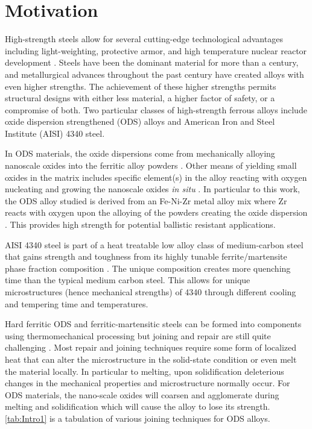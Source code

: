 
\section*{Motivation}
	High-strength steels allow for several cutting-edge technological advantages including light-weighting, protective armor, and high temperature nuclear reactor development \cite{RN707}. Steels have been the dominant material for more than a century, and metallurgical advances throughout the past century have created alloys with even higher strengths. The achievement of these higher strengths permits structural designs with either less material, a higher factor of safety, or a compromise of both. Two particular classes of high-strength ferrous alloys include oxide dispersion strengthened (ODS) alloys and American Iron and Steel Institute (AISI) 4340 steel. 
	
	In ODS materials, the oxide dispersions come from mechanically alloying nanoscale oxides into the ferritic alloy powders \cite{RN1177}. Other means of yielding small oxides in the matrix includes specific element(s) in the alloy reacting with oxygen nucleating and growing the nanoscale oxides \textit{in situ} \cite{RN114}. In particular to this work, the ODS alloy studied is derived from an Fe-Ni-Zr metal alloy mix where Zr reacts with oxygen upon the alloying of the powders creating the oxide dispersion \cite{RN740}. This provides high strength for potential ballistic resistant applications. 
	
	AISI 4340 steel is part of a heat treatable low alloy class of medium-carbon steel that gains strength and toughness from its highly tunable ferrite/martensite phase fraction composition \cite{RN1435, RN1429, RN1447, RN1438}. The unique composition creates more quenching time than the typical medium carbon steel. This allows for unique microstructures (hence mechanical strengths) of 4340 through different cooling and tempering time and temperatures.
	
	Hard ferritic ODS and ferritic-martensitic steels can be formed into components using thermomechanical processing but joining and repair are still quite challenging \cite{RN3361}. Most repair and joining techniques require some form of localized heat that can alter the microstructure in the solid-state condition or even melt the material locally. In particular to melting, upon solidification deleterious changes in the mechanical properties and microstructure normally occur. For ODS materials, the nano-scale oxides will coarsen and agglomerate during melting and solidification which will cause the alloy to lose its strength. \ref{tab:Intro1} is a tabulation of various joining techniques for ODS alloys.
	
